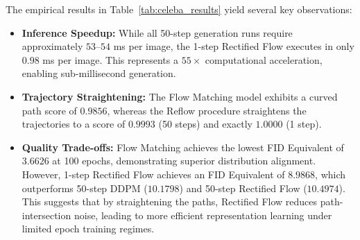 \documentclass[11pt,a4paper]{article}
\begin{document}
The empirical results in Table~\ref{tab:celeba_results} yield several key observations:
\begin{itemize}
    \item \textbf{Inference Speedup:} While all 50-step generation runs require approximately $53$--$54$ ms per image, the 1-step Rectified Flow executes in only $0.98$ ms per image. This represents a $55\times$ computational acceleration, enabling sub-millisecond generation.
    \item \textbf{Trajectory Straightening:} The Flow Matching model exhibits a curved path score of $0.9856$, whereas the Reflow procedure straightens the trajectories to a score of $0.9993$ (50 steps) and exactly $1.0000$ (1 step).
    \item \textbf{Quality Trade-offs:} Flow Matching achieves the lowest FID Equivalent of $3.6626$ at 100 epochs, demonstrating superior distribution alignment. However, 1-step Rectified Flow achieves an FID Equivalent of $8.9868$, which outperforms 50-step DDPM ($10.1798$) and 50-step Rectified Flow ($10.4974$). This suggests that by straightening the paths, Rectified Flow reduces path-intersection noise, leading to more efficient representation learning under limited epoch training regimes.
\end{itemize}
\end{document}

